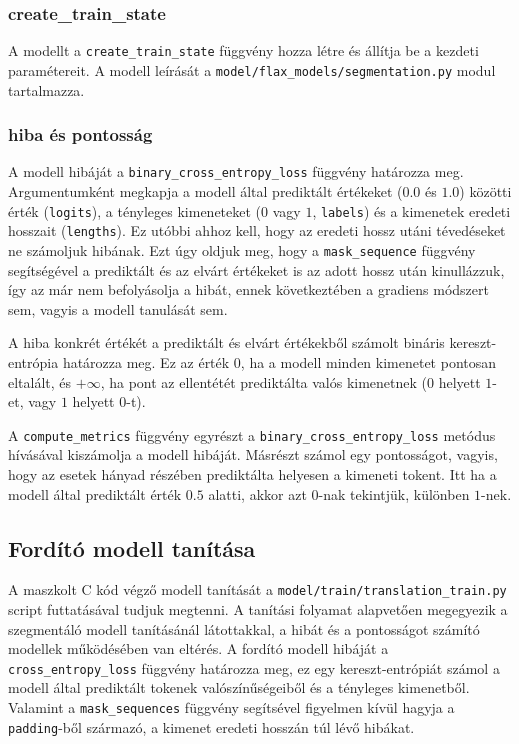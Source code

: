 \subsubsection{create\_train\_state}
A modellt a \texttt{create\_train\_state} függvény hozza létre és állítja be a kezdeti paramétereit.
A modell leírását a \texttt{model/flax\_models/segmentation.py} modul tartalmazza.

\subsubsection{hiba és pontosság}
A modell hibáját a \texttt{binary\_cross\_entropy\_loss} függvény határozza meg. Argumentumként megkapja
a modell által prediktált értékeket ($0.0$ és $1.0$) közötti érték (\texttt{logits}), a tényleges kimeneteket
($0$ vagy $1$, \texttt{labels}) és a kimenetek eredeti hosszait (\texttt{lengths}). Ez utóbbi ahhoz kell,
hogy az eredeti hossz utáni tévedéseket ne számoljuk hibának. Ezt úgy oldjuk meg, hogy a
\texttt{mask\_sequence} függvény segítségével a prediktált és az elvárt értékeket is
az adott hossz után kinullázzuk, így az már nem befolyásolja a hibát, ennek következtében
a gradiens módszert sem, vagyis a modell tanulását sem.

A hiba konkrét értékét a prediktált és elvárt értékekből számolt bináris kereszt-entrópia határozza meg.
Ez az érték $0$, ha a modell minden kimenetet pontosan eltalált, és $+\infty$, ha pont az ellentétét
prediktálta valós kimenetnek ($0$ helyett $1$-et, vagy $1$ helyett $0$-t).

A \texttt{compute\_metrics} függvény egyrészt a \texttt{binary\_cross\_entropy\_loss} metódus hívásával
kiszámolja a modell hibáját. Másrészt számol egy pontosságot, vagyis, hogy az esetek hányad részében
prediktálta helyesen a kimeneti tokent. Itt ha a modell által prediktált érték $0.5$ alatti, akkor azt
$0$-nak tekintjük, különben $1$-nek.

\subsection{Fordító modell tanítása}
A maszkolt C kód végző modell tanítását a \texttt{model/train/translation\_train.py}
script futtatásával tudjuk megtenni. A tanítási folyamat alapvetően megegyezik a szegmentáló modell
tanításánál látottakkal, a hibát és a pontosságot számító modellek működésében van eltérés.
A fordító modell hibáját a \texttt{cross\_entropy\_loss} függvény határozza meg, ez egy kereszt-entrópiát
számol a modell által prediktált tokenek valószínűségeiből és a tényleges kimenetből. Valamint a
\texttt{mask\_sequences} függvény segítsével figyelmen kívül hagyja a \texttt{padding}-ből származó,
a kimenet eredeti hosszán túl lévő hibákat.

